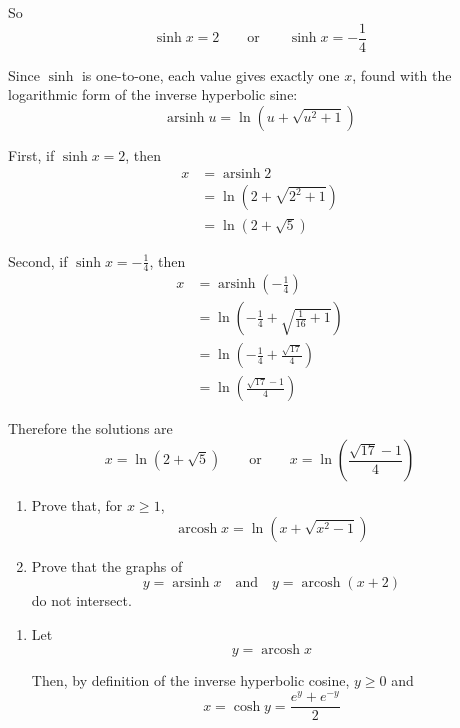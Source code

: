 \documentclass[leqno]{article}
\begin{document}
\begin{enumerate}[
  label=\textbf{\arabic*.},
  leftmargin=*,
  topsep=0pt,
  partopsep=0pt,
  parsep=0pt
]
\begin{djsSolution}
\begin{enumerate}[label=\textbf{(\alph*)}]
So
\[
\sinh x=2 \qquad \text{or} \qquad \sinh x=-\frac14
\]

Since \(\sinh\) is one-to-one, each value gives exactly one \(x\), found with the logarithmic form of the inverse hyperbolic sine:
\[
\operatorname{arsinh} u=\ln\left(u+\sqrt{u^2+1}\right)
\]

First, if \(\sinh x=2\), then
\begin{align*}
x&=\operatorname{arsinh} 2\\
&=\ln\left(2+\sqrt{2^2+1}\right)\\
&=\ln\left(2+\sqrt5\right)
\end{align*}

Second, if \(\sinh x=-\frac14\), then
\begin{align*}
x&=\operatorname{arsinh}\left(-\frac14\right)\\
&=\ln\left(-\frac14+\sqrt{\frac{1}{16}+1}\right)\\
&=\ln\left(-\frac14+\frac{\sqrt{17}}{4}\right)\\
&=\ln\left(\frac{\sqrt{17}-1}{4}\right)
\end{align*}

Therefore the solutions are
\[
x=\ln(2+\sqrt5)
\qquad \text{or} \qquad
x=\ln\left(\frac{\sqrt{17}-1}{4}\right)
\]
\end{enumerate}
\end{djsSolution}


\newpage

\questionitem

\begin{enumerate}[label=\textbf{(\alph*)}]
  \item Prove that, for $x\ge 1$,
  \[
  \operatorname{arcosh} x = \ln\left(x+\sqrt{x^2-1}\right)
  \]
  \item Prove that the graphs of
  \[
  y=\operatorname{arsinh} x \quad \text{and} \quad y=\operatorname{arcosh}(x+2)
  \]
  do not intersect.  \\
\end{enumerate}

\vspace*{10pt}

\begin{djsSolution}
\begin{enumerate}[label=\textbf{(\alph*)}]
  \item Let
\[
y=\operatorname{arcosh}x
\]

Then, by definition of the inverse hyperbolic cosine, \(y\geq 0\) and
\[
x=\cosh y=\frac{e^y+e^{-y}}{2}
\]


\end{enumerate}
\end{djsSolution}
\end{enumerate}
\end{document}
